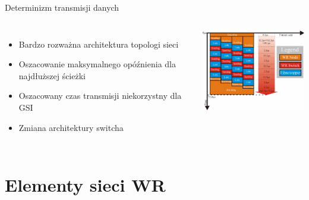 \documentclass[compress,red]{beamer}
\begin{document}
\begin{frame}{Determinizm transmisji danych}


  \begin{columns}[c]

  

  \begin{itemize}
    \item Bardzo rozważna architektura topologi sieci
    \item Oszacowanie maksymalnego opóźnienia dla najdłuższej ścieżki
    \item Oszacowany czas transmisji niekorzystny dla GSI
    \item Zmiana architektury switcha
  \end{itemize}

  

      \begin{center}
      \includegraphics[width=6cm]{robustness/latencyEstimation.pdf}
      \end{center}

      

  \end{columns}


\end{frame}


\section{Elementy sieci WR}
\end{document}
